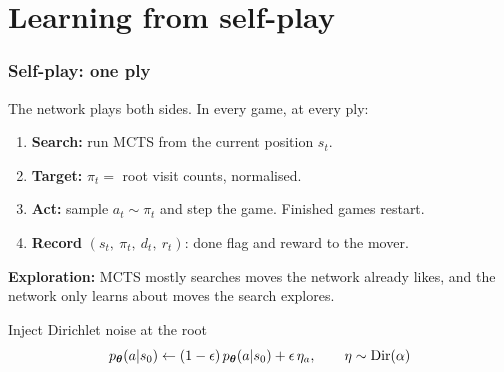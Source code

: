\section{Learning from self-play}

\begin{frame}
    \frametitle{Self-play: one ply}
    The network plays both sides. In every game, at every ply:
    \begin{enumerate}
        \item \textbf{Search:} run MCTS from the current position $s_t$.
        \item \textbf{Target:} $\pi_t = $ root visit counts, normalised.
        \item \textbf{Act:} sample $a_t \sim \pi_t$ and step the game. Finished games restart.
        \item \textbf{Record} $(s_t,\ \pi_t,\ d_t,\ r_t)$: done flag and reward to the mover.
    \end{enumerate}
    \pause
    \vspace{0.2cm}
    \textbf{Exploration:} MCTS mostly searches moves the network already likes, and the network
    only learns about moves the search explores.
    \pause
    \begin{block}{Inject Dirichlet noise at the root}
        $$
        p_{\boldsymbol{\theta}}(a|s_0) \leftarrow (1-\epsilon)\, p_{\boldsymbol{\theta}}(a|s_0) + \epsilon\, \eta_a,
        \qquad \eta \sim \text{Dir}(\alpha)
        $$
    \end{block}
\end{frame}


